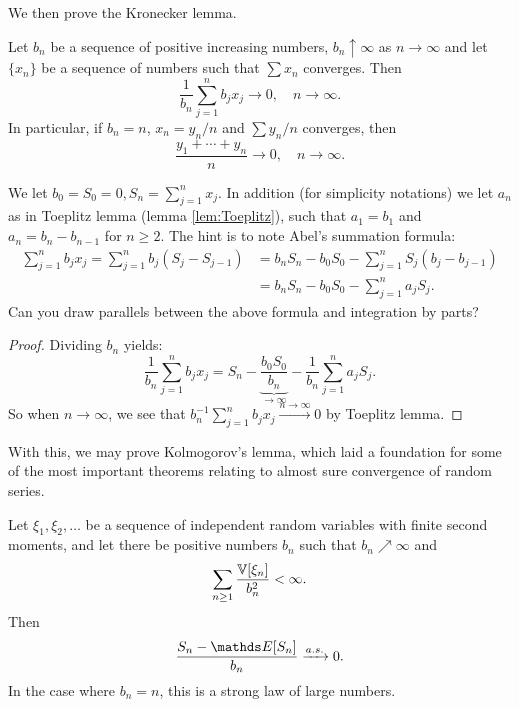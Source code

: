 We then prove the Kronecker lemma.
\begin{lemma}[Kronecker]
Let $b_n$ be a sequence of positive increasing numbers, $b_n \uparrow \infty$ as $n \to \infty$ and let $\{x_n\}$ be a sequence of numbers such that $\sum x_n$ converges. Then 
\begin{equation*}
    \frac{1}{b_n}\sum_{j=1}^n b_j x_j \to 0, \quad n \to \infty.
\end{equation*}
In particular, if $b_n = n$, $x_n = y_n/n$ and $\sum y_n/n$ converges, then 
\begin{equation*}
    \frac{y_1 + \cdots + y_n}{n} \to 0, \quad n \to \infty.
\end{equation*}
\end{lemma}

\begin{hint}
We let $b_0 = S_0 = 0, S_n = \sum_{j=1}^n x_j$. In addition (for simplicity notations) we let $a_n$ as in Toeplitz lemma (lemma \ref{lem:Toeplitz}), such that $a_1 = b_1$ and $a_n = b_n - b_{n-1}$ for $n \geq 2$. The hint is to note Abel's summation formula:
\begin{align*}
    \sum_{j=1}^n b_j x_j = \sum_{j=1}^n b_j (S_j - S_{j-1}) &= b_n S_n - b_0 S_0 - \sum_{j=1}^n S_j (b_j - b_{j-1}) \\
    &= b_n S_n - b_0 S_0 - \sum_{j=1}^n a_j S_j.
\end{align*}
Can you draw parallels between the above formula and integration by parts?
\end{hint}

\begin{proof}
Dividing $b_n$ yields:
\begin{equation}
    \frac{1}{b_n} \sum_{j=1}^n b_j x_j = S_n - \underbrace{\frac{b_0 S_0}{b_n}}_{\to \infty} - \frac{1}{b_n} \sum_{j=1}^n a_j S_j.
\end{equation}
So when $n\to \infty$, we see that $b_n^{-1} \sum_{j=1}^n b_j x_j \overset{n\to\infty}{\to} 0$ by Toeplitz lemma.
\end{proof}

With this, we may prove Kolmogorov's lemma, which laid a foundation for some of the most important theorems relating to almost sure convergence of random series.

\begin{theorem}[Kolmogorov]
Let $\xi_1, \xi_2,\dots$ be a sequence of independent random
variables with finite second moments, and let there be positive numbers $b_n$ such that $b_n \nearrow \infty$ and 
\begin{equation*}
    \sum_{n\geq 1} \frac{\mathbb{V}[\xi_n]}{b_n^2} < \infty.
\end{equation*}
Then 
\begin{equation*}
    \frac{S_n - \E[S_n]}{b_n} \xrightarrow{a.s.} 0.
\end{equation*}
In the case where $b_n = n$, this is a strong law of large numbers.
\end{theorem}

